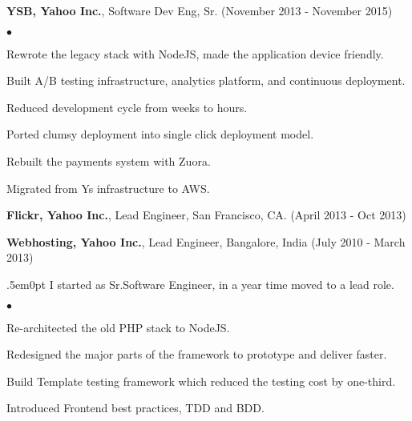 \documentclass[margin, line, 10pt]{res}
\newenvironment{list2}{
  \begin{list}{$\bullet$}{%
      \setlength{\itemsep}{0in}
      \setlength{\parsep}{0in} \setlength{\parskip}{0in}
      \setlength{\topsep}{0in} \setlength{\partopsep}{0in}
      \setlength{\leftmargin}{0.2in}}}{\end{list}}
\begin{document}
\begin{resume}
{\Large {\bf YSB, Yahoo Inc.}}, Software Dev Eng, Sr. (November 2013 - November 2015)\\
\vspace{-.1cm}
\begin{list2}
\vspace{.1cm}
\item Rewrote the legacy stack with NodeJS, made the application device friendly.
\item Built A/B testing infrastructure, analytics platform, and continuous deployment.
\item Reduced development cycle from weeks to hours.
\item Ported clumsy deployment into single click deployment model.
\item Rebuilt the payments system with Zuora.
\item Migrated from Y\textsc{}s infrastructure to AWS.
\end{list2}
\vspace{.05cm}

{\Large {\bf Flickr, Yahoo Inc.}}, Lead Engineer, San Francisco, CA.  \hfill (April 2013 - Oct 2013)\\
\vspace{-.1cm}

{\Large {\bf Webhosting, Yahoo Inc.}}, Lead Engineer, Bangalore, India  \hfill (July 2010 - March 2013)\\
\vspace{-.1cm}
\begin{adjustwidth}{.5em}{0pt}
I started as Sr.Software Engineer, in a year time moved to a lead role.\\
\vspace{-.1cm}
\begin{list2}
\vspace{-.3cm}
\item Re-architected the old PHP stack to NodeJS.\\
\vspace{-.3cm}
\item Redesigned the major parts of the framework to prototype and deliver faster.\\
\vspace{-.3cm}
\item Build Template testing framework which reduced the testing cost by one-third.\\
\vspace{-.3cm}
\item Introduced Frontend best practices, TDD and BDD.\\
\end{list2}
\vspace{.05cm}
\end{adjustwidth}


\end{resume}
\end{document}

